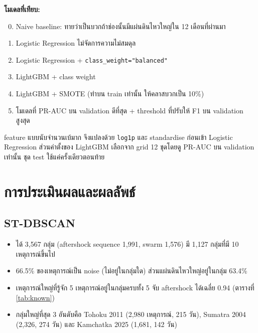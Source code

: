 \documentclass[11pt,a4paper]{article}
\newcommand{\code}[1]{\texttt{#1}}
\begin{document}
\textbf{โมเดลที่เทียบ:}
\begin{enumerate}
  \setcounter{enumi}{-1}
  \item Naive baseline: ทายว่าเป็นบวกถ้าช่องนั้นมีแผ่นดินไหวใหญ่ใน 12 เดือนที่ผ่านมา
  \item Logistic Regression ไม่จัดการความไม่สมดุล
  \item Logistic Regression + \code{class\_weight="balanced"}
  \item LightGBM \cite{ke2017} + class weight
  \item LightGBM + SMOTE \cite{chawla2002} (ทำบน train เท่านั้น ให้คลาสบวกเป็น 10\%)
  \item โมเดลที่ PR-AUC บน validation ดีที่สุด + threshold ที่ปรับให้ F1 บน validation สูงสุด
\end{enumerate}
feature แบบนับจำนวนเบ้มาก จึงแปลงด้วย \code{log1p} และ standardise ก่อนเข้า Logistic Regression
ส่วนค่าตั้งของ LightGBM เลือกจาก grid 12 ชุดโดยดู PR-AUC บน validation เท่านั้น ชุด test ใช้แค่ครั้งเดียวตอนท้าย

\section{การประเมินผลและผลลัพธ์}

\subsection{ST-DBSCAN}
\begin{itemize}
  \item ได้ 3{,}567 กลุ่ม (aftershock sequence 1{,}991, swarm 1{,}576) มี 1{,}127 กลุ่มที่มี 10 เหตุการณ์ขึ้นไป
  \item 66.5\% ของเหตุการณ์เป็น noise (ไม่อยู่ในกลุ่มใด) ส่วนแผ่นดินไหวใหญ่อยู่ในกลุ่ม 63.4\%
  \item เหตุการณ์ใหญ่ที่รู้จัก 5 เหตุการณ์อยู่ในกลุ่มครบทั้ง 5 จับ aftershock ได้เฉลี่ย 0.94 (ตารางที่ \ref{tab:known})
  \item กลุ่มใหญ่ที่สุด 3 อันดับคือ Tohoku 2011 (2{,}980 เหตุการณ์, 215 วัน), Sumatra 2004 (2{,}326, 274 วัน) และ Kamchatka 2025 (1{,}681, 142 วัน)
\end{itemize}
\end{document}
